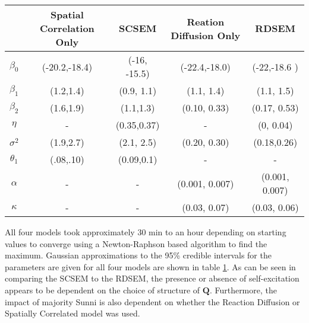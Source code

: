 \documentclass[11pt]{isuthesis}
\begin{document}
\begin{table}[h]
	 \label{tab:params} 
	\begin{center}
		\begin{tabular}{ |c|c|c|c|c| } 
			\hline
			& Spatial Correlation Only & SCSEM & Reation Diffusion Only & RDSEM \\
			\hline 
			$\beta_0$&(-20.2,-18.4) &(-16, -15.5) &(-22.4,-18.0) &(-22,-18.6 )\\
			$\beta_1$& (1.2,1.4)&(0.9, 1.1) &(1.1, 1.4) &(1.1, 1.5)\\
			$\beta_2$& (1.6,1.9)&(1.1,1.3) &(0.10, 0.33) &(0.17, 0.53)\\
			$\eta$& - &(0.35,0.37) & -  &(0, 0.04)\\
			$\sigma^2$&(1.9,2.7) &(2.1, 2.5) & (0.20, 0.30)&(0.18,0.26)\\
			$\theta_1$&(.08,.10) &(0.09,0.1) & - & - \\
			$\alpha$& - & - & (0.001, 0.007) &(0.001, 0.007)\\
			$\kappa$& - & - & (0.03, 0.07) &(0.03, 0.06) \\
			\hline
		\end{tabular}
	\end{center}
\end{table}


All four models took approximately 30 min to an hour depending on starting values to converge using a Newton-Raphson based algorithm to find the maximum.  Gaussian approximations to the 95\% credible intervals for the parameters are given for all four models are shown in table \ref{tab:params}.  As can be seen in comparing the SCSEM to the RDSEM, the presence or absence of self-excitation appears to be dependent on the choice of structure of $\boldsymbol{Q}$.  Furthermore, the impact of majority Sunni is also dependent on whether the Reaction Diffusion or Spatially Correlated model was used.
\end{document}
